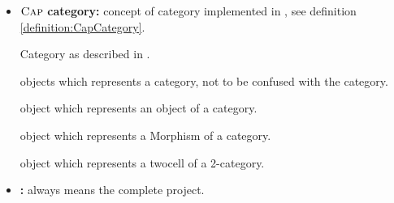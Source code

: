 
\begin{itemize}
 
 \itembold{\GAP *} interpret * in the context of \GAP, e.g., a \GAP filter is
   a filter in the context of \GAP.
 
  function object in \GAP.
 
  operation object in \GAP.
 
  function installed for some operation via InstallMethod.
 
  function with name \texttt{Add*}, which adds functions as methods
   to the operation *.
 
  operation for which functions can be added to the category, e.g., \texttt{PreCompose}.
 
  basic operation which represents a categorical construction. \texttt{IsIdenticalToIdentity}
   is a basic operation which is not a Categorical operation.
 
  The variable name or string which represents a basic operation.
 
  basic operation which has the string \texttt{WithGiven} in its basic operation symbol.
 
  basic operation in a category for which the functions are installed via Add functions, not via
   derivations.
 
  basic operation in a category which is installed by the derivation mechanism of \CapPkg.
 
  \CapPkg category.
 
 \item{$\textsc{Cap}$ \textbf{category:}} concept of category implemented in \CapPkg, see definition \ref{definition:CapCategory}.
 
  Category as described in \cite{MLCWM}.
 
  \GAP objects which represents a \CapPkg category, not to be confused with the \GAP category.
 
  \GAP object which represents an object of a category.
 
  \GAP object which represents a Morphism of a category.
 
  \GAP object which represents a twocell of a 2-category.
 
 \item{\CapPkg\textbf{:}} always means the complete \CapPkg project.
 
\end{itemize}
